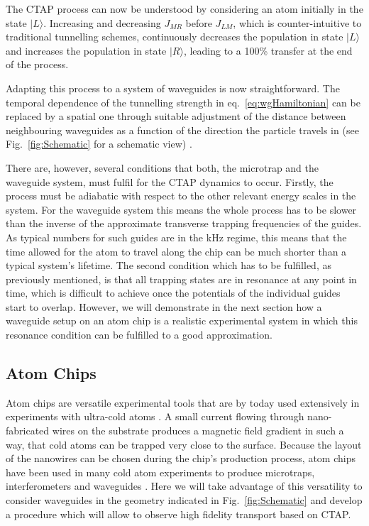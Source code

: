 The CTAP process can now be understood by considering an atom initially in the state $|L\rangle$. Increasing and decreasing $J_{MR}$
before $J_{LM}$, which is counter-intuitive to traditional tunnelling schemes, continuously decreases the population in state $|L\rangle$
and increases the population in state $|R\rangle$, leading to a 100\% transfer at the end of the process.

Adapting this process to a system of waveguides is now straightforward. The temporal dependence of the tunnelling strength in eq.~\eqref{eq:wgHamiltonian} can be replaced by a spatial one through suitable adjustment of the distance between neighbouring waveguides as a function of the direction the particle travels in (see Fig.~\ref{fig:Schematic} for a schematic view) \cite{Eckert:06}.

There are, however, several conditions that both, the microtrap and the waveguide system, must fulfil for the CTAP dynamics to occur. Firstly, the process must be adiabatic with respect to the other relevant energy scales in the system. For the waveguide system this means the whole process has to be slower than the inverse of the approximate transverse trapping frequencies of the guides. As typical numbers for such guides are in the kHz regime, this means that the time allowed for the atom to travel along the chip  can be much shorter than a typical system's lifetime. The second condition which has to be fulfilled, as previously mentioned, is that all trapping states are in resonance at any point in time, which is difficult to achieve once the potentials of the individual guides start to overlap. However, we will demonstrate in the next section how a waveguide setup on an atom chip is a realistic experimental system in which this resonance condition can be fulfilled to a good approximation.

\subsection{Atom Chips}
\label{sec:Atom Chips}

Atom chips are versatile experimental tools that are by today used extensively in experiments with ultra-cold atoms \cite{Folman:00,Fortagh:07}. A small current flowing through nano-fabricated wires on the substrate produces a magnetic field gradient in such a way, that cold atoms can be trapped very close to the surface. Because the layout of the nanowires can be chosen during the chip's production process, atom chips have been used in many cold atom experiments to produce microtraps, interferometers and waveguides \cite{Fortagh:07,Schwindt:05,Schumm:05,Petrovic:11}. Here we will take advantage of this versatility to consider waveguides in the geometry indicated in Fig.~\ref{fig:Schematic} and develop a procedure which will allow to observe high fidelity transport based on CTAP.

